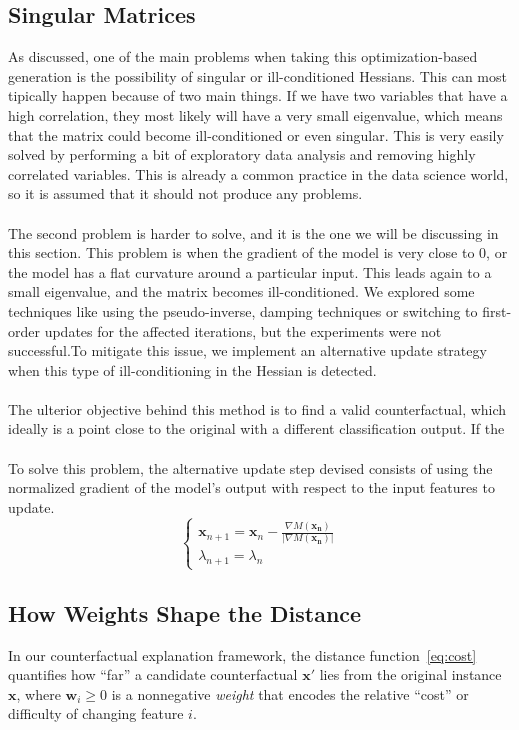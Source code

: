 \documentclass[12pt]{extarticle}
\numberwithin{equation}{section}
\begin{document}
\subsection{Singular Matrices}
As discussed, one of the main problems when taking this optimization-based generation is the possibility of singular or ill-conditioned Hessians. This can most tipically happen because of two main things. If we have two variables that have a high correlation, they most likely will have a very small eigenvalue, which means that the matrix could become ill-conditioned or even singular. This is very easily solved by performing a bit of exploratory data analysis and removing highly correlated variables. This is already a common practice in the data science world, so it is assumed that it should not produce any problems.\\
\\
The second problem is harder to solve, and it is the one we will be discussing in this section. This problem is when the gradient of the model is very close to 0, or the model has a flat curvature around a particular input. This leads again to a small eigenvalue, and the matrix becomes ill-conditioned. We explored some techniques like using the pseudo-inverse, damping techniques or switching to first-order updates for the affected iterations, but the experiments were not successful.To mitigate this issue, we implement an alternative update strategy when this type of ill-conditioning in the Hessian is detected. \\
\\
The ulterior objective behind this method is to find a valid counterfactual, which ideally is a point close to the original with a different classification output. If the \\
\\
To solve this problem, the alternative update step devised consists of using the normalized gradient of the model's output with respect to the input features to update. 
\begin{equation}
    \begin{cases}
    \mathbf{x}_{n+1} = \mathbf{x}_n - \frac{\nabla M(\mathbf{x_n})}{|\nabla M(\mathbf{x_n})|}
    \\
    \lambda_{n+1} = \lambda_n
    \end{cases}
\end{equation}



\subsection{How Weights Shape the Distance}
In our counterfactual explanation framework, the distance function~\eqref{eq:cost} quantifies how “far” a candidate counterfactual \(\mathbf{x}'\) lies from the original instance \(\mathbf{x}\), where \(\mathbf{w}_i \ge 0\) is a nonnegative \emph{weight} that encodes the relative “cost” or difficulty of changing feature \(i\).
\end{document}
